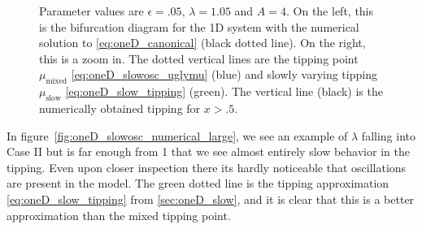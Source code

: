 \begin{figure}[H]
\begin{subfigure}{.5\textwidth}
 \caption{}
\end{subfigure}
\caption{Parameter values are $\epsilon=.05$, $\lambda=1.05$ and $A=4$. On the left, this is the bifurcation diagram for the 1D system with the numerical solution to \eqref{eq:oneD_canonical} (black dotted line). On the right, this is a zoom in. The dotted vertical lines are the tipping point $\mu_{\text{mixed}}$ \eqref{eq:oneD_slowosc_uglymu} (blue) and slowly varying tipping $\mu_{\text{slow}}$ \eqref{eq:oneD_slow_tipping} (green). The vertical line (black) is the numerically obtained tipping for $x>.5$.}
\label{fig:oneD_slowosc_numerical_medium}
\end{figure}

In figure~\ref{fig:oneD_slowosc_numerical_large}, we see an example of $\lambda$ falling into Case II but is far enough from 1 that we see almost entirely slow behavior in the tipping. Even upon closer inspection there its hardly noticeable that oscillations are present in the model. The green dotted line is the tipping approximation \eqref{eq:oneD_slow_tipping} from \autoref{sec:oneD_slow}, and it is clear that this is a better approximation than the mixed tipping point.

